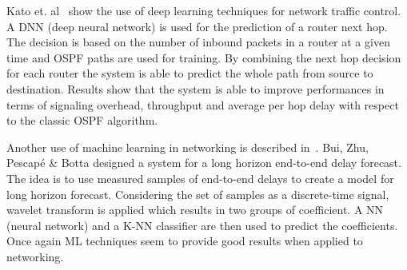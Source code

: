 Kato et. al~\cite{deep_learning_heterogeneus} show the use of deep learning techniques for network traffic control. A DNN (deep neural network) is used for the prediction of a router next hop. The decision is based on the number of inbound packets in a router at a given time and OSPF paths are used for training. By combining the next hop decision for each router the system is able to predict the whole path from source to destination. Results show that the system is able to improve performances in terms of signaling overhead, throughput and average per hop delay with respect to the classic OSPF algorithm.

Another use of machine learning in networking is described in~\cite{end-to-end}. Bui, Zhu, Pescapé \& Botta designed a system for a long horizon end-to-end delay forecast. The idea is to use measured samples of end-to-end delays to create a model for long horizon forecast. Considering the set of samples as a discrete-time signal, wavelet transform is applied which results in two groups of coefficient. A NN (neural network) and a K-NN classifier are then used to predict the coefficients. Once again ML techniques seem to provide good results when applied to networking.